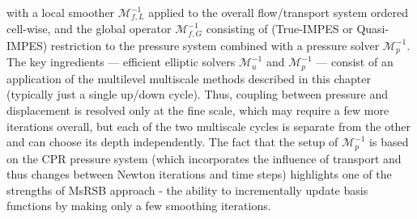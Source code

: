 with a local smoother $\mathcal{M}_{f,L}^{-1}$ applied to the overall flow/transport system ordered cell-wise, and the global operator $\mathcal{M}_{f,G}^{-1}$ consisting of (True-IMPES or Quasi-IMPES) restriction to the pressure system combined with a pressure solver $\mathcal{M}_p^{-1}$.   The key ingredients --- efficient elliptic solvers $\mathcal{M}_u^{-1}$ and $\mathcal{M}_p^{-1}$ --- consist of an application of the multilevel multiscale methods described in this chapter (typically just a single up/down cycle).   Thus, coupling between pressure and displacement is resolved only at the fine scale, which may require a few more iterations overall, but each of the two multiscale cycles is separate from the other and can choose its depth independently.   The fact that the setup of $\mathcal{M}_p^{-1}$ is based on the CPR pressure system (which incorporates the influence of transport and thus changes between Newton iterations and time steps) highlights one of the strengths of MsRSB approach - the ability to incrementally update basis functions by making only a few smoothing iterations.

